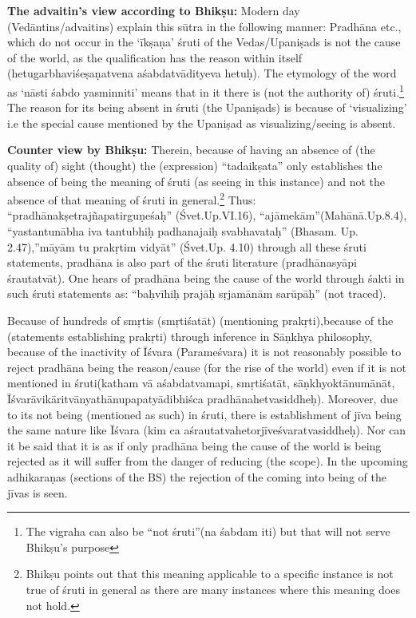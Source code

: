 \textbf{The advaitin’s view according to Bhikṣu:} Modern day (Vedāntins/\-advaitins) explain this sūtra in the following manner: Pradhāna etc., which do not occur in the ‘īkṣaṇa’ śruti of the Vedas/Upaniṣads is not the cause of the world, as the qualification has the reason within itself (hetugarbhaviśeṣaṇatvena  aśabdatvādityeva hetuḥ).  The etymology of the word as ‘nāsti śabdo yasminniti’ means that in it there is (not the authority of) śruti.\footnote{The vigraha can also be “not śruti”(na śabdam iti) but that will not serve Bhikṣu’s purpose} The reason for its being absent in śruti (the Upaniṣads) is because of ‘visualizing’ i.e the special cause mentioned by the Upaniṣad as visualizing/seeing is absent. 

\textbf{Counter view by Bhikṣu:} Therein, because of having an absence of (the quality of) sight (thought) the (expression) “tadaikṣata” only establishes the absence of being the meaning of śruti (as seeing in this instance) and not the absence of that meaning of śruti in general.\footnote{Bhikṣu points out that this meaning applicable to a specific instance is not true of śruti in general as there are many instances where this meaning does not hold.} Thus: “pradhānakṣetrajñapatirguṇeśaḥ” (Śvet.Up.VI.16), “ajāmekām”(Mahānā.Up.8.4), “yastantunābha iva tantubhiḥ padhanajaiḥ svabhavataḥ” (Bhasam. Up. 2.47),”māyām tu prakṛtim vidyāt” (Śvet.Up. 4.10) through all these śruti statements, pradhāna is also part of the śruti literature (pradhānasyāpi śrautatvāt). One hears of pradhāna being the cause of the world through śakti in such śruti statements as: “baḥvīhiḥ prajāḥ sṛjamānām sarūpāḥ” (not traced).

Because of hundreds of smṛtis (smṛtiśatāt) (mentioning prakṛti),\break because of the (statements establishing prakṛti) through inference in Sāṇkhya philosophy, because of the inactivity of Īśvara (Parameśvara) it is not reasonably possible to reject pradhāna being the reason/cause (for the rise of the world) even if it is not mentioned in śruti(katham vā aśabdatvamapi, smṛtiśatāt, sāṇkhyoktānumānāt, Īśvarāvikāritvānya\-thānupapatyādibhiśca pradhānahetvasiddheḥ). Moreover, due to its not being (mentioned as such) in śruti, there is establishment of jīva being the same nature like Īśvara (kim ca aśrautatvahetorjīveśvaratvasiddheḥ). Nor can it be said that it is as if only pradhāna being the cause of the world is being rejected as it will suffer from the danger of reducing (the scope). In the upcoming adhikaraṇas (sections of the BS) the rejection of the coming into being of the jīvas is seen.

